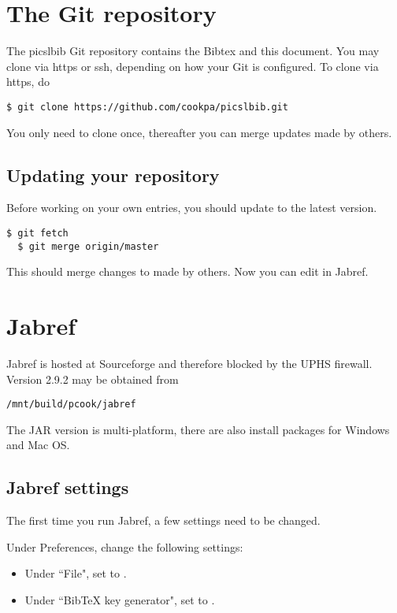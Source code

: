 \documentclass{InsightArticle}
\begin{document}
\section{The Git repository}

The picslbib Git repository contains the Bibtex and this document. You may clone via https or ssh, depending on how your Git is configured. To clone via https, do
\begin{lstlisting}[style=bash]
  $ git clone https://github.com/cookpa/picslbib.git
\end{lstlisting}

You only need to clone once, thereafter you can merge updates made by others. 


\subsection{Updating your repository}

Before working on your own entries, you should update to the latest version.
\begin{lstlisting}[style=bash]
  $ git fetch
  $ git merge origin/master
\end{lstlisting}

This should merge changes to  made by others. Now you can edit  in Jabref.

\section{Jabref}

Jabref is hosted at Sourceforge and therefore blocked by the UPHS firewall. Version 2.9.2 may be obtained from
\begin{lstlisting}[style=bash]
  /mnt/build/pcook/jabref
\end{lstlisting}
The JAR version is multi-platform, there are also install packages for Windows and Mac OS.

\subsection{Jabref settings}

The first time you run Jabref, a few settings need to be changed.

Under Preferences, change the following settings:
\begin{itemize}
\item Under ``File", set  to .
\item Under ``BibTeX key generator", set  to .
\end{itemize}
\end{document}
